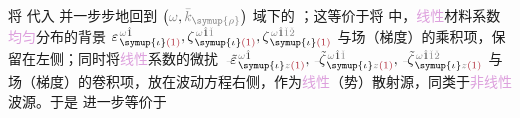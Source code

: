 将  代入  并一步步地回到 $\left( \mathcolor{gray}{\omega}, \mathcolor{gray}{\bar{k}_{\symup{\rho}}} \right)$ 域下的 ；这等价于将  中，\textcolor{Plum}{线性}材料系数\textcolor{Plum}{均匀}分布的背景 $\varepsilon^{\;\! \mathcolor{gray}{\omega} \hat{1}}_{\;\! \symup{\iota} \textcolor{Maroon}{(1)}}, \zeta^{\;\! \mathcolor{gray}{\omega} \hat{1} \mathcolor{gray}{\check{1}}}_{\;\! \symup{\iota} \textcolor{Maroon}{(1)}}, \zeta^{\;\! \mathcolor{gray}{\omega} \hat{1} \mathcolor{gray}{\check{1} \check{2}}}_{\;\! \symup{\iota} \textcolor{Maroon}{(1)}}$ 与场（梯度）的乘积项，保留在左侧；同时将\textcolor{Plum}{线性}系数的\textcolor{NavyBlue}{微扰} $\Xint{\begin{smallmatrix} ~ \\ {}^{}_{\mathcolor{gray}{-}} \\ ~ \end{smallmatrix}}{16}{\tilde{\varepsilon}}^{\;\! \mathcolor{gray}{\omega} \hat{1}}_{\;\! \symup{\iota} \mathcolor{gray}{z} \textcolor{Maroon}{(1)}}, \Xint{\begin{smallmatrix} ~ \\ {}^{}_{\mathcolor{gray}{-}} \\ ~ \end{smallmatrix}}{12}{\tilde{\zeta}}^{\;\! \mathcolor{gray}{\omega} \hat{1} \mathcolor{gray}{\check{1}}}_{\;\! \symup{\iota} \mathcolor{gray}{z} \textcolor{Maroon}{(1)}}, \Xint{\begin{smallmatrix} ~ \\ {}^{}_{\mathcolor{gray}{-}} \\ ~ \end{smallmatrix}}{12}{\tilde{\zeta}}^{\;\! \mathcolor{gray}{\omega} \hat{1} \mathcolor{gray}{\check{1} \check{2}}}_{\;\! \symup{\iota} \mathcolor{gray}{z} \textcolor{Maroon}{(1)}}$ 与场（梯度）的卷积项，放在波动方程右侧，作为\textcolor{Plum}{线性}（势）散射源\cite{bornPrinciplesOptics60th2019,gerkeAperiodicVolumeOptics2010}，同类于\textcolor{Plum}{非线性}波源。于是  进一步等价于
